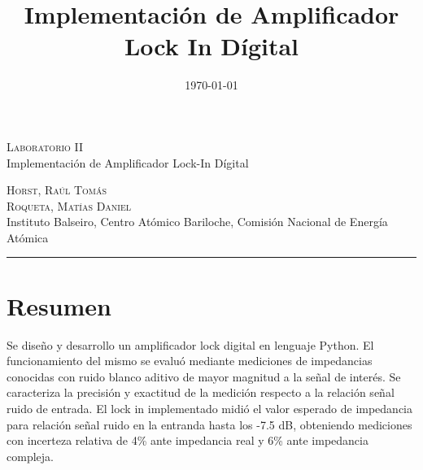 \documentclass[11pt,a4paper]{extarticle}
\date{\small{\today}}
\begin{document}
\title{Implementación de Amplificador Lock In Dígital}
	\LARGE{\textsc{Laboratorio II}}\\
	\Large{Implementación de Amplificador Lock-In Dígital}\\
\begin{large}
\small\textsc{Horst, Raúl Tomás}\\
\small\textsc{Roqueta, Matías Daniel}\\
\small{Instituto Balseiro, Centro Atómico Bariloche, Comisión Nacional de Energía Atómica}\\
\end{large}
\setcounter{page}{1}

\chead{}

\rfoot{\thepage} 
\renewcommand{\headrulewidth}{0.4pt} 
\renewcommand{\footrulewidth}{0.4pt} 
\pagestyle{fancy}

\hrule
\normalsize
\section{Resumen}
Se diseño y desarrollo un amplificador lock digital en lenguaje Python. 
El funcionamiento del mismo se evaluó mediante 
mediciones de impedancias conocidas con ruido blanco aditivo 
de mayor magnitud a la señal 
de interés. Se caracteriza la precisión y exactitud de la medición respecto a la relación señal ruido de entrada. 
El lock in implementado midió el valor esperado de impedancia para 
relación señal ruido en la entranda hasta los -7.5 dB,
obteniendo mediciones con incerteza relativa de 4\% ante impedancia real y 6\% ante impedancia compleja.
\end{document}
